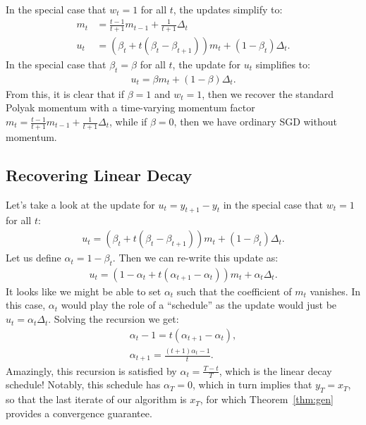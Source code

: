 \documentclass{article}
\begin{document}
In the special case that $w_t=1$ for all $t$, the updates simplify to:
\begin{align*}
    m_t  &= \frac{t-1}{t+1} m_{t-1} + \frac{1}{t+1} \Delta_t\\
    u_t  &= \left(\beta_t + t(\beta_t-\beta_{t+1})\right)m_t + (1-\beta_t) \Delta_t.
\end{align*}
In the special case that $\beta_t=\beta$ for all $t$, the update for $u_t$ simplifies to:
\begin{align*}
    u_t = \beta m_t + (1-\beta) \Delta_t.
\end{align*}
From this, it is clear that if $\beta = 1$ and $w_t=1$, then we recover the standard Polyak momentum with a time-varying momentum factor $m_t  = \frac{t-1}{t+1} m_{t-1} + \frac{1}{t+1} \Delta_t$, while if $\beta=0$, then we have ordinary SGD without momentum.










\subsection{Recovering Linear Decay}\label{app:recoverdecay}

Let's take a look at the update for $u_t=y_{t+1}-y_t$ in the special case that $w_t=1$ for all $t$:
\begin{align*}
    u_t  = \left(\beta_t + t(\beta_t- \beta_{t+1})\right)m_t + (1-\beta_t) \Delta_t.
\end{align*}
Let us define $\alpha_t = 1-\beta_t$. Then we can re-write this update as:
\begin{align*}
    u_t  = \left(1 - \alpha_t + t(\alpha_{t+1}- \alpha_t)\right)m_t + \alpha_t \Delta_t.
\end{align*}
It looks like we might be able to set $\alpha_t$ such that the coefficient of $m_t$ vanishes. In this case, $\alpha_t$ would play the role  of a ``schedule'' as the update would just be $u_t = \alpha_t \Delta_t$. Solving the recursion we get:
\begin{align*}
    \alpha_t-1= t(\alpha_{t+1}-\alpha_t),\\
    \alpha_{t+1} = \frac{(t+1)\alpha_t - 1}{t}.
\end{align*}
Amazingly, this recursion is satisfied by $\alpha_t =\frac{T-t}{T}$, which is the linear decay schedule! Notably, this schedule has $\alpha_T=0$, which in turn implies that $y_T = x_T$, so that the last iterate of our algorithm is $x_T$, for which Theorem~\ref{thm:gen} provides a convergence guarantee.
\end{document}
